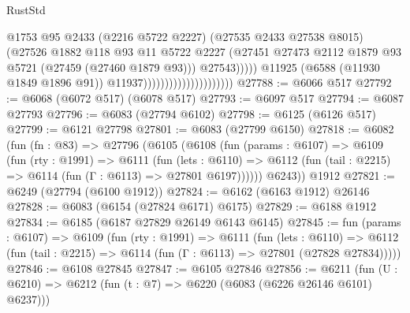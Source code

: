 \begin{lexlean}{RustStd}
\begin{coremodule}
                                                      @1753
                                                      @95
                                                      @2433
                                                      (@2216 @5722 @2227)
                                                      (@27535 @2433 @27538 @8015)
                                                      (@27526
                                                        @1882
                                                        @118
                                                        @93
                                                        @11
                                                        @5722
                                                        @2227
                                                        (@27451
                                                          @27473
                                                          @2112
                                                          @1879
                                                          @93
                                                          @5721
                                                          (@27459 (@27460 @1879 @93)))
                                                        @27543)))))
                                              @11925
                                              (@6588 (@11930 @1849 @1896 @91))
                                              @11937)))))))))))))))))))))
@27788 := @6066 @517
@27792 := @6068 (@6072 @517) (@6078 @517)
@27793 := @6097 @517
@27794 := @6087 @27793
@27796 := @6083 (@27794 @6102)
@27798 := @6125 (@6126 @517)
@27799 := @6121 @27798
@27801 := @6083 (@27799 @6150)
@27818 := @6082
    (fun (fn : @83) =>
    @27796
      (@6105
        (@6108
          (fun (params : @6107) =>
          @6109
            (fun (rty : @1991) =>
            @6111
              (fun (lets : @6110) =>
              @6112 (fun (tail : @2215) => @6114 (fun (Γ : @6113) => @27801 @6197))))))
        @6243))
    @1912
@27821 := @6249 (@27794 (@6100 @1912))
@27824 := @6162 (@6163 @1912) @26146
@27828 := @6083 (@6154 (@27824 @6171) @6175)
@27829 := @6188 @1912
@27834 := @6185 (@6187 @27829 @26149 @6143 @6145)
@27845 := fun (params : @6107) =>
  @6109
    (fun (rty : @1991) =>
    @6111
      (fun (lets : @6110) =>
      @6112 (fun (tail : @2215) => @6114 (fun (Γ : @6113) => @27801 (@27828 @27834)))))
@27846 := @6108 @27845
@27847 := @6105 @27846
@27856 := @6211
    (fun (U : @6210) => @6212 (fun (t : @7) => @6220 (@6083 (@6226 @26146 @6101) @6237)))

\end{coremodule}
\end{lexlean}
